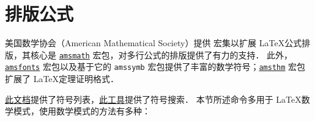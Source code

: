 \newpage
\section{排版公式}
%
美国数学协会（American Mathematical Society）提供  \AmS 宏集以扩展 \LaTeX 公式排版，其核心是 \href{https://ctan.org/pkg/amsmath}{\texttt{amsmath}} 宏包，对多行公式的排版提供了有力的支持．
此外，\href{https://ctan.org/pkg/amsfonts}{\texttt{amsfonts}} 宏包以及基于它的 \verb|amssymb| 宏包提供了丰富的数学符号；\href{https://ctan.org/pkg/amsthm}{\texttt{amsthm}} 宏包扩展了 \LaTeX 定理证明格式．

\href{https://ctan.org/tex-archive/info/symbols/comprehensive/}{此文档}提供了符号列表，\href{http://detexify.kirelabs.org/classify.html}{此工具}提供了符号搜索．
本节所述命令多用于 \LaTeX 数学模式，使用数学模式的方法有多种：

